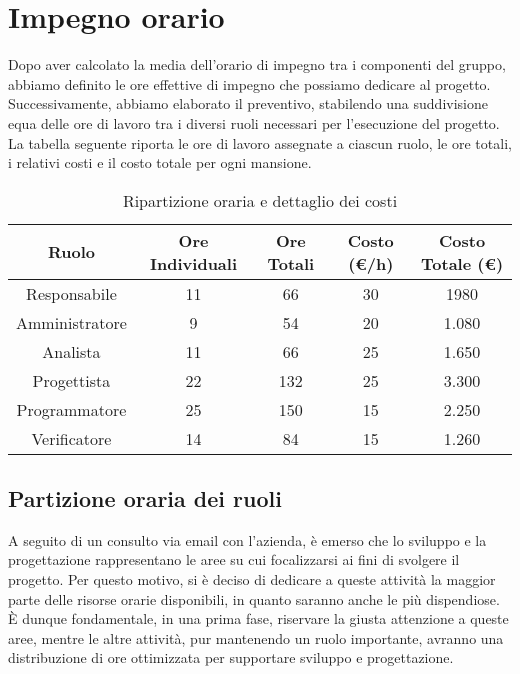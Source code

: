 \section{Impegno orario}

Dopo aver calcolato la media dell’orario di impegno tra i componenti del gruppo, abbiamo definito le ore effettive di impegno che possiamo dedicare al progetto. Successivamente, abbiamo elaborato il preventivo, stabilendo una suddivisione equa delle ore di lavoro tra i diversi ruoli necessari per l’esecuzione del progetto.
La tabella seguente riporta le ore di lavoro assegnate a ciascun ruolo, le ore totali, i relativi costi e il costo totale per ogni mansione.

\vspace{0.5cm}

\begin{table}[h]
    \centering
    \begin{tabular}{|c|c|c|c|c|}
        \hline
        \rowcolor[gray]{0.9}
        \textbf{Ruolo} & \textbf{Ore Individuali} & \textbf{Ore Totali} & \textbf{Costo (\euro/h)} & \textbf{Costo Totale (\euro)} \\
        \hline
        Responsabile & 11 & 66 & 30 & 1980 \\
        \hline
        Amministratore & 9 & 54 & 20 & 1.080 \\
        \hline
        Analista & 11 & 66 & 25 & 1.650 \\
        \hline
        Progettista & 22 & 132 & 25 & 3.300 \\
        \hline
        Programmatore & 25 & 150 & 15 & 2.250 \\
        \hline
        Verificatore & 14 & 84 & 15 & 1.260 \\
        \hline
    \end{tabular}
    \caption{Ripartizione oraria e dettaglio dei costi}
\end{table}

\vspace{0.5cm}
\subsection{Partizione oraria dei ruoli}
A seguito di un consulto via email con l'azienda, è emerso che lo sviluppo e la progettazione rappresentano le aree su cui focalizzarsi ai fini di svolgere il progetto. Per questo motivo, si è deciso di dedicare a queste attività la maggior parte delle risorse orarie disponibili, in quanto saranno anche le più dispendiose. È dunque fondamentale, in una prima fase, riservare la giusta attenzione a queste aree, mentre le altre attività, pur mantenendo un ruolo importante, avranno una distribuzione di ore ottimizzata per supportare sviluppo e progettazione.
